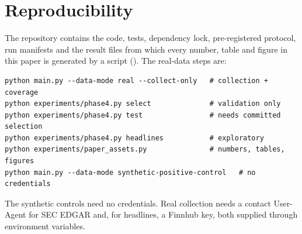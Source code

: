 \documentclass[11pt]{article}
\begin{document}
\section{Reproducibility}
The repository contains the code, tests, dependency lock, pre-registered protocol, run manifests and
the result files from which every number, table and figure in this paper is generated by
a script (). The real-data steps are:
{\small
\begin{verbatim}
python main.py --data-mode real --collect-only   # collection + coverage
python experiments/phase4.py select              # validation only
python experiments/phase4.py test                # needs committed selection
python experiments/phase4.py headlines           # exploratory
python experiments/paper_assets.py               # numbers, tables, figures
python main.py --data-mode synthetic-positive-control   # no credentials
\end{verbatim}}
The synthetic controls need no credentials. Real collection needs a contact
User-Agent for SEC EDGAR and, for headlines, a Finnhub key, both supplied through environment
variables.



\end{document}
